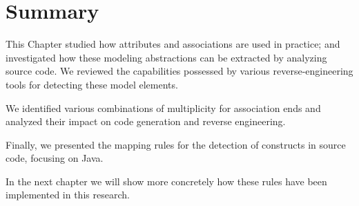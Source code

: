\section{Summary}

This Chapter  studied how attributes and associations are used in practice; and investigated how these modeling abstractions can be extracted by analyzing source code. We reviewed
the capabilities possessed by various reverse-engineering tools for detecting these model elements. 

We identified various  combinations of multiplicity for association ends and analyzed their impact on code generation and reverse engineering. 

Finally, we presented the  mapping rules for the detection of constructs in source code, focusing on Java.

In the next chapter we will show more concretely how these rules have been implemented in this research.


